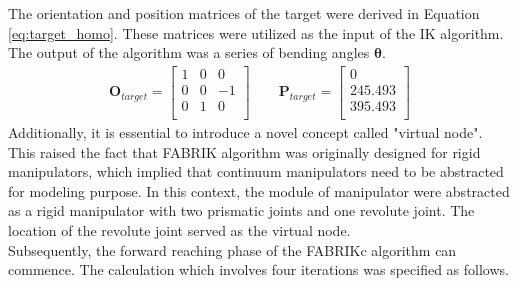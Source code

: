 \noindent The orientation and position matrices of the target were derived in Equation 
\ref{eq:target_homo}. These matrices were utilized as the input of the IK algorithm. The output of the algorithm 
was a series of bending angles $\boldsymbol{\theta}$.
\begin{align}
    \textbf{O}_{target} = 
    \begin{bmatrix}
        1 & 0 & 0 \\
        0 & 0 & -1 \\
        0 & 1 & 0 \\
    \end{bmatrix} 
    \qquad
    \textbf{P}_{target} = 
    \begin{bmatrix}
        0 \\
        245.493 \\
        395.493 \\
    \end{bmatrix} 
    \label{eq:target_homo} 
\end{align}
Additionally, it is essential to introduce a novel concept called "virtual node". This raised the fact that FABRIK 
algorithm was originally designed for rigid manipulators, which implied that continuum manipulators need to be abstracted 
for modeling purpose. In this context, the module of manipulator were abstracted as a rigid manipulator with two prismatic 
joints and one revolute joint. The location of the revolute joint served as the virtual node. \\
Subsequently, the forward reaching phase of the FABRIKc algorithm can commence. The calculation which involves four 
iterations was specified as follows.
